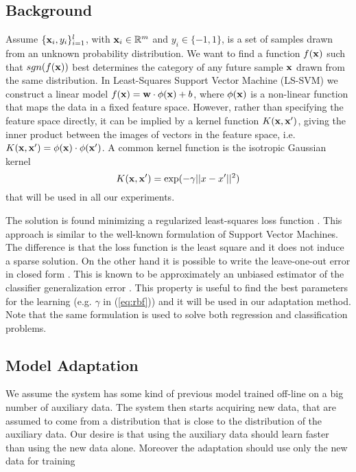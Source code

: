 \subsection{Background}

Assume $\{\mathbf{x}_i,y_i\}_{i=1}^l$, with $\mathbf{x}_i \in \mathbb{R}^m$ and $y_i \in
\{-1,1\}$, is a set of samples drawn from an unknown probability
distribution. We want to find a function $f(\mathbf{x})$ such that
$sgn(f(\mathbf{x}))$ best determines the category of any future sample $\mathbf{x}$
drawn from the same distribution. In Least-Squares Support Vector Machine (LS-SVM)
we construct a linear model $f(\mathbf{x})=\mathbf{w} \cdot \phi(\mathbf{x}) + b$, where
$\phi(\mathbf{x})$ is a non-linear function that maps the data in a fixed feature space.
However, rather than specifying the feature space directly,
it can be implied by a kernel function $K(\mathbf{x},\mathbf{x}')$, giving the
inner product between the images of vectors in the feature
space, i.e. $K(\mathbf{x},\mathbf{x}')=\phi(\mathbf{x}) \cdot \phi(\mathbf{x}')$.
A common kernel function is the isotropic Gaussian kernel
\begin{equation}
	K(\xx,\xx')=\exp(-\gamma ||x-x'||^2)
	\label{eq:rbf}
\end{equation}
that will be used in all our experiments.

The solution is found minimizing a regularized least-squares loss function \cite{Cristianini00}.
This approach is similar to the well-known formulation of Support Vector
Machines. The difference is that the loss function is the least square and it
does not induce a sparse solution. On the other hand it is possible to write
the leave-one-out error in closed form \cite{Rifkin07}. This is known to be
approximately an unbiased estimator of the classifier generalization error
\cite{LuntzB69}. This property is useful to find the best parameters for the
learning (e.g. $\gamma$ in (\ref{eq:rbf})) and it will be used in our
adaptation method. Note that the same formulation is used to solve both
regression and classification problems.

\subsection{Model Adaptation}

We assume the system has some kind of previous model trained off-line on a big
number of auxiliary data. The system then starts acquiring new data, that are
assumed to come from a distribution that is close to the distribution of the
auxiliary data. Our desire is that using the auxiliary data should learn faster
than using the new data alone. Moreover the adaptation should use only the new
data for training 

